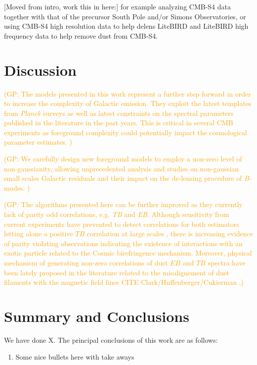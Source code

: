 \documentclass[twocolumn]{aastex631}
\newcommand{\giuse}[1]{\textcolor{orange}{(GP: #1)}}
\begin{document}
[Moved from intro, work this in here:]
for example analyzing CMB-S4 data together with that of the precursor South Pole and/or Simons Observatories, or using CMB-S4 high resolution data to help delens LiteBIRD and LiteBIRD high frequency data to help remove dust from CMB-S4.


\section{Discussion} \label{sec:discussion}

\giuse{The models presented in this work represent a further step forward in order to increase the complexity of Galactic emission. They  exploit the latest templates from \emph{Planck } surveys as well as latest  constraints on the spectral parameters published in the literature in the past years. 
This is  critical in several CMB experiments as foreground complexity  could  potentially impact  the  cosmological parameter estimates. }

\giuse{We carefully design new foreground  models to employ a non-zero level of non-gaussianity, allowing  unprecedented analysis and studies on non-gaussian small scales Galactic residuals and their impact on the de-lensing procedure of \emph{B-}modes. }


\giuse{The algorithms presented here can be further improved as they  currently lack of parity odd correlations, e.g.  \emph{TB} and \emph{EB}. Although sensitivity from   current experiments have prevented to detect  correlations for both estimators letting alone  a positive $TB$  correlation  at large scales \citep{planck2016-l04}, there is increasing evidence of parity violating observations \citep{Eskilt:2022, Philcox:2022} indicating  the existence of  interactions with an exotic  particle related to the Cosmic birefringence mechanism. 
Moreover, physical mechanism of generating non-zero correlations of dust $EB$ and $TB$ spectra have been lately proposed in the literature related to the misalignement of dust filaments with the magnetic field lines CITE Clark/Huffenberger/Cukierman .} 


\section{Summary and Conclusions} \label{sec:summary}

We have done X. The principal conclusions of this work are as follows:

\begin{enumerate}
    \item Some nice bullets here with take aways 
\end{enumerate}
\end{document}
